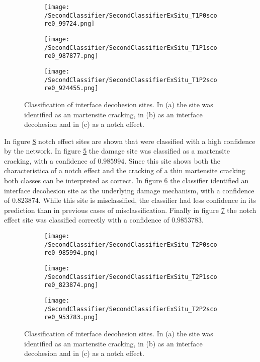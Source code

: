 \begin{figure}[H]
\centering
\begin{subfigure}{0.3\textwidth}
\texttt{[image: /SecondClassifier/SecondClassifierExSitu\_T1P0score0\_99724.png]}
\caption{}
\label{sub:ExSituInterfaceDecohesionSamplesM}
\end{subfigure}
\begin{subfigure}{0.3\textwidth}
\texttt{[image: /SecondClassifier/SecondClassifierExSitu\_T1P1score0\_987877.png]}
\caption{}
\label{sub:ExSituInterfaceDecohesionSamplesID}
\end{subfigure}
\begin{subfigure}{0.3\textwidth}
\texttt{[image: /SecondClassifier/SecondClassifierExSitu\_T1P2score0\_924455.png]}
\caption{}
\label{sub:ExSituInterfaceDecohesionSamplesN}
\end{subfigure}
\caption{Classification of interface decohesion sites. In (a) the site was identified as an martensite cracking, in (b) as an interface decohesion and in (c) as a notch effect. }
\label{fig:ExSituInterfaceDecohesionSamples}
\end{figure}

In figure \ref{fig:ExSituNotchEffectSamples} notch effect sites are shown that were classified with a high confidence by the network. In figure \ref{sub:ExSituNotchEffectSamplesM} the damage site was classified as a martensite cracking, with a confidence of $0.985994$. Since this site shows both the characteristica of a notch effect and the cracking of a thin martensite cracking both classes can be interpreted as correct. In figure \ref{sub:ExSituNotchEffectSamplesI} the classifier identified an interface decohesion site as the underlying damage mechanism, with a confidence of $0.823874$. While this site is misclassified, the classifier had less confidence in its prediction than in previous cases of misclassification. Finally in figure \ref{sub:ExSituNotchEffectSamplesN} the notch effect site was classified correctly with a confidence of $0.9853783$. 

\begin{figure}[H]
\centering
\begin{subfigure}{0.3\textwidth}
\texttt{[image: /SecondClassifier/SecondClassifierExSitu\_T2P0score0\_985994.png]}
\caption{}
\label{sub:ExSituNotchEffectSamplesM}
\end{subfigure}
\begin{subfigure}{0.3\textwidth}
\texttt{[image: /SecondClassifier/SecondClassifierExSitu\_T2P1score0\_823874.png]}
\caption{}
\label{sub:ExSituNotchEffectSamplesI}
\end{subfigure}
\begin{subfigure}{0.3\textwidth}
\texttt{[image: /SecondClassifier/SecondClassifierExSitu\_T2P2score0\_953783.png]}
\caption{}
\label{sub:ExSituNotchEffectSamplesN}
\end{subfigure}
\caption{Classification of interface decohesion sites. In (a) the site was identified as an martensite cracking, in (b) as an interface decohesion and in (c) as a notch effect. }
\label{fig:ExSituNotchEffectSamples}
\end{figure}


